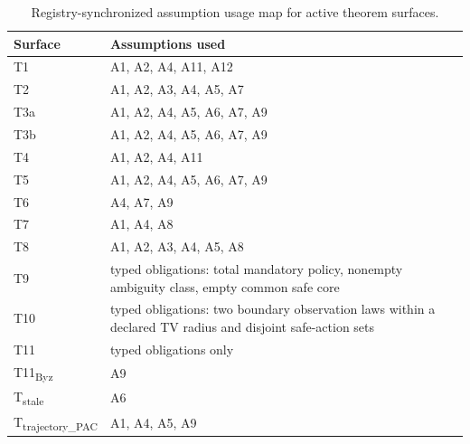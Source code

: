 \begin{table}[htbp]
\centering
\caption{Registry-synchronized assumption usage map for active theorem surfaces.}
\label{tab:assumption-usage}
\small
\begin{tabular}{@{}ll@{}}
\toprule
\textbf{Surface} & \textbf{Assumptions used} \\
\midrule
T1 & A1, A2, A4, A11, A12 \\
T2 & A1, A2, A3, A4, A5, A7 \\
T3a & A1, A2, A4, A5, A6, A7, A9 \\
T3b & A1, A2, A4, A5, A6, A7, A9 \\
T4 & A1, A2, A4, A11 \\
T5 & A1, A2, A4, A5, A6, A7, A9 \\
T6 & A4, A7, A9 \\
T7 & A1, A4, A8 \\
T8 & A1, A2, A3, A4, A5, A8 \\
T9 & typed obligations: total mandatory policy, nonempty ambiguity class, empty common safe core \\
T10 & typed obligations: two boundary observation laws within a declared TV radius and disjoint safe-action sets \\
T11 & typed obligations only \\
T11\textsubscript{Byz} & A9 \\
T\textsubscript{stale} & A6 \\
T\textsubscript{trajectory\_PAC} & A1, A4, A5, A9 \\
\bottomrule
\end{tabular}
\end{table}
